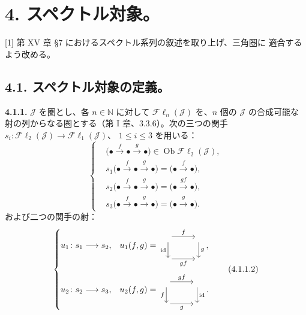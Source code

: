 \clearpage
{}%
\begingroup\small\setlength{\parskip}{0pt}\setlength{\emergencystretch}{1.5em}
\section*{4. スペクトル対象。}

[1] 第 XV 章 \S 7 におけるスペクトル系列の叙述を取り上げ、三角圏に
適合するよう改める。

\subsection*{4.1. スペクトル対象の定義。}

\medskip\noindent\textbf{4.1.1.}\quad
$\mathcal J$ を圏とし、各 $n\in\mathbb N$ に対して
$\mathcal{F}\ell_n(\mathcal J)$ を、$n$ 個の $\mathcal J$ の合成可能な
射の列からなる圏とする（第 I 章、3.3.6）。次の三つの関手
$s_i\colon\mathcal{F}\ell_2(\mathcal J)\to\mathcal{F}\ell_1(\mathcal J)$、
$1\leq i\leq3$ を用いる：
\[
\left\{
\begin{aligned}
&\bigl(\mathord\bullet\xrightarrow f\mathord\bullet\xrightarrow g\mathord\bullet\bigr)
   \in\operatorname{Ob}\mathcal{F}\ell_2(\mathcal J),\\
&s_1\bigl(\mathord\bullet\xrightarrow f\mathord\bullet\xrightarrow g\mathord\bullet\bigr)
   =\bigl(\mathord\bullet\xrightarrow f\mathord\bullet\bigr),\\
&s_2\bigl(\mathord\bullet\xrightarrow f\mathord\bullet\xrightarrow g\mathord\bullet\bigr)
   =\bigl(\mathord\bullet\xrightarrow{gf}\mathord\bullet\bigr),\\
&s_3\bigl(\mathord\bullet\xrightarrow f\mathord\bullet\xrightarrow g\mathord\bullet\bigr)
   =\bigl(\mathord\bullet\xrightarrow g\mathord\bullet\bigr).
\end{aligned}
\right.
\tag{4.1.1.1}
\]
および二つの関手の射：
\[
\left\{
\begin{aligned}
&u_1\colon s_1\longrightarrow s_2,
&&u_1(f,g)=
\begin{tikzcd}[ampersand replacement=\&,column sep=2.8em,row sep=1.9em,baseline=(current bounding box.center)]
{}\arrow[r,"f"]\arrow[d,"\operatorname{id}"']\&{}\arrow[d,"g"]\\
{}\arrow[r,"gf"']\&{}
\end{tikzcd},\\[2pt]
&u_2\colon s_2\longrightarrow s_3,
&&u_2(f,g)=
\begin{tikzcd}[ampersand replacement=\&,column sep=2.8em,row sep=1.9em,baseline=(current bounding box.center)]
{}\arrow[r,"gf"]\arrow[d,"f"']\&{}\arrow[d,"\operatorname{id}"]\\
{}\arrow[r,"g"']\&{}
\end{tikzcd}.
\end{aligned}
\right.
\tag{4.1.1.2}
\]

